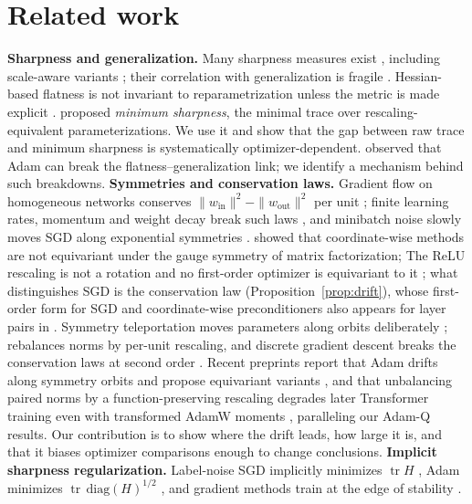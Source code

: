 \documentclass[10pt,twocolumn]{article}
\theoremstyle{remark}
\newcommand{\tr}{\operatorname{tr}}
\begin{document}
\section{Related work}
\textbf{Sharpness and generalization.} Many sharpness measures exist \citep{keskar2017large,jiang2020fantastic}, including scale-aware variants \citep{kwon2021asam,tsuzuku2020normalized,petzka2021relative,rangamani2019scale,li2018visualizing}; their correlation with generalization is fragile \citep{jiang2020fantastic,andriushchenko2023modern,kaur2023maximum}. Hessian-based flatness is not invariant to reparametrization unless the metric is made explicit \citep{kristiadi2023geometry,ahmed2026fisher}. \citet{ibayashi2021minimum} proposed \emph{minimum sharpness}, the minimal trace over rescaling-equivalent parameterizations. We use it and show that the gap between raw trace and minimum sharpness is systematically optimizer-dependent. \citet{zhang2021flatness} observed that Adam can break the flatness--generalization link; we identify a mechanism behind such breakdowns.
\textbf{Symmetries and conservation laws.} Gradient flow on homogeneous networks conserves $\|w_{\mathrm{in}}\|^2-\|w_{\mathrm{out}}\|^2$ per unit \citep{du2018algorithmic}; finite learning rates, momentum and weight decay break such laws \citep{kunin2021neural,marcotte2023abide,marcotte2024keep}, and minibatch noise slowly moves SGD along exponential symmetries \citep{ziyin2023law,ziyin2024parameter}. \citet{singh2026loss} showed that coordinate-wise methods are not equivariant under the gauge symmetry of matrix factorization; The ReLU rescaling is not a rotation and no first-order optimizer is equivariant to it \citep{kim2026same}; what distinguishes SGD is the conservation law (Proposition~\ref{prop:drift}), whose first-order form for SGD and coordinate-wise preconditioners also appears for layer pairs in \citet[Lemma~7]{shirodkar2026dead}. Symmetry teleportation moves parameters along orbits deliberately \citep{zhao2022teleport,zhao2024improving,lebeurrier2026path}; \citet{saul2023weight} rebalances norms by per-unit rescaling, and discrete gradient descent breaks the conservation laws at second order \citep{medeiros2026conservation}. Recent preprints report that Adam drifts along symmetry orbits and propose equivariant variants \citep{shirodkar2026dead}, and that unbalancing paired norms by a function-preserving rescaling degrades later Transformer training even with transformed AdamW moments \citep{kim2026same}, paralleling our Adam-Q results. Our contribution is to show where the drift leads, how large it is, and that it biases optimizer comparisons enough to change conclusions.
\textbf{Implicit sharpness regularization.} Label-noise SGD implicitly minimizes $\tr H$ \citep{blanc2020implicit,damian2021label}, Adam minimizes $\tr\,\mathrm{diag}(H)^{1/2}$ \citep{li2025adam}, and gradient methods train at the edge of stability \citep{cohen2021eos,cohen2022adaptive}.
\end{document}
